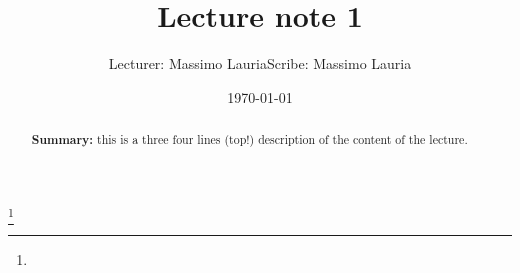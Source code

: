 \documentclass[a4paper,symmetric,justified,10pt]{tufte-handout}
\title{Lecture note 1}
\author{Lecturer: Massimo Lauria\hspace{3em}Scribe: Massimo Lauria}
\date{\today}
\begin{document}



\maketitle
%

\begin{abstract}
  \textbf{Summary:} this is a three four lines (top!) description of
  the content of the lecture.
\end{abstract}


\lipsum[1]



\lipsum[3]\footnote{\lipsum[4]}

\newpage

\lipsum[4]

\newpage

\lipsum[5]







\end{document}
